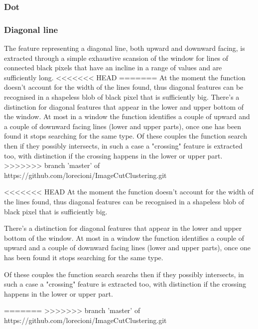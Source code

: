 \documentclass[a4paper,12pt]{article}
\begin{document}
\subsubsection{Dot}

\subsubsection{Diagonal line}
The feature representing a diagonal line, both upward and downward facing, is extracted through a simple exhaustive scansion of the window for lines of connected black pixels that have an incline in a range of values and are sufficiently long.
<<<<<<< HEAD
=======
At the moment the function doesn't account for the width of the lines found, thus diagonal features can be recognised in a shapeless blob of black pixel that is sufficiently big.    
There's a distinction for diagonal features that appear in the lower and upper bottom of the window.
At most in a window the function identifies a couple of upward and a couple of downward facing lines (lower and upper parts), once one has been found it stops searching for the same type.
Of these couples the function search %
 then if they possibly intersects, in such a case a "crossing" feature is extracted too, with distinction if the crossing happens in the lower or upper part. 
>>>>>>> branch 'master' of https://github.com/lorecioni/ImageCutClustering.git

<<<<<<< HEAD
At the moment the function doesn't account for the width of the lines found, thus diagonal features can be recognised in a shapeless blob of black pixel that is sufficiently big. 
   
There's a distinction for diagonal features that appear in the lower and upper bottom of the window.
At most in a window the function identifies a couple of upward and a couple of downward facing lines (lower and upper parts), once one has been found it stops searching for the same type.

Of these couples the function search searchs then if they possibly intersects, in such a case a "crossing" feature is extracted too, with distinction if the crossing happens in the lower or upper part. 

=======
>>>>>>> branch 'master' of https://github.com/lorecioni/ImageCutClustering.git
\end{document}
